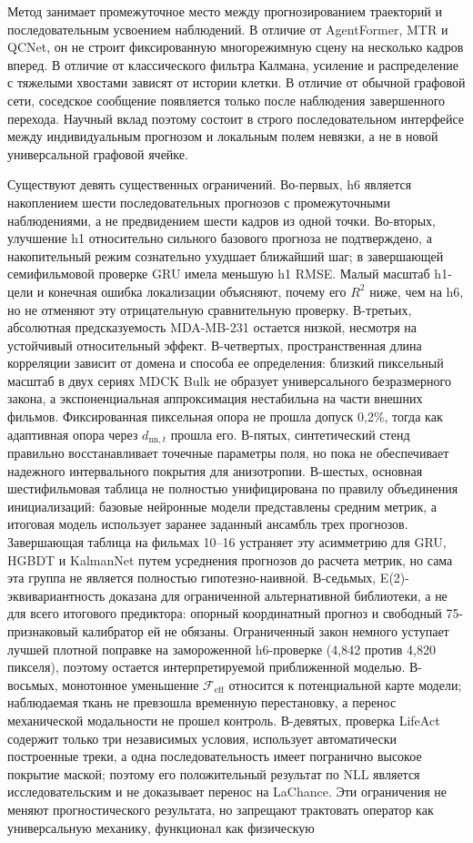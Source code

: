 \documentclass[11pt,a4paper]{article}
\begin{document}
Метод занимает промежуточное место между прогнозированием траекторий и последовательным усвоением наблюдений. В отличие от AgentFormer, MTR и QCNet, он не строит фиксированную многорежимную сцену на несколько кадров вперед. В отличие от классического фильтра Калмана, усиление и распределение с тяжелыми хвостами зависят от истории клетки. В отличие от обычной графовой сети, соседское сообщение появляется только после наблюдения завершенного перехода. Научный вклад поэтому состоит в строго последовательном интерфейсе между индивидуальным прогнозом и локальным полем невязки, а не в новой универсальной графовой ячейке.

Существуют девять существенных ограничений. Во-первых, h6 является накоплением шести последовательных прогнозов с промежуточными наблюдениями, а не предвидением шести кадров из одной точки. Во-вторых, улучшение h1 относительно сильного базового прогноза не подтверждено, а накопительный режим сознательно ухудшает ближайший шаг; в завершающей семифильмовой проверке GRU имела меньшую h1 RMSE. Малый масштаб h1-цели и конечная ошибка локализации объясняют, почему его $R^2$ ниже, чем на h6, но не отменяют эту отрицательную сравнительную проверку. В-третьих, абсолютная предсказуемость MDA-MB-231 остается низкой, несмотря на устойчивый относительный эффект. В-четвертых, пространственная длина корреляции зависит от домена и способа ее определения: близкий пиксельный масштаб в двух сериях MDCK Bulk не образует универсального безразмерного закона, а экспоненциальная аппроксимация нестабильна на части внешних фильмов. Фиксированная пиксельная опора не прошла допуск 0,2\%, тогда как адаптивная опора через $d_{\mathrm{nn},t}$ прошла его. В-пятых, синтетический стенд правильно восстанавливает точечные параметры поля, но пока не обеспечивает надежного интервального покрытия для анизотропии. В-шестых, основная шестифильмовая таблица не полностью унифицирована по правилу объединения инициализаций: базовые нейронные модели представлены средним метрик, а итоговая модель использует заранее заданный ансамбль трех прогнозов. Завершающая таблица на фильмах 10--16 устраняет эту асимметрию для GRU, HGBDT и KalmanNet путем усреднения прогнозов до расчета метрик, но сама эта группа не является полностью гипотезно-наивной. В-седьмых, E(2)-эквивариантность доказана для ограниченной альтернативной библиотеки, а не для всего итогового предиктора: опорный координатный прогноз и свободный 75-признаковый калибратор ей не обязаны. Ограниченный закон немного уступает лучшей плотной поправке на замороженной h6-проверке (4,842 против 4,820 пикселя), поэтому остается интерпретируемой приближенной моделью. В-восьмых, монотонное уменьшение $\mathcal F_{\mathrm{eff}}$ относится к потенциальной карте модели; наблюдаемая ткань не превзошла временную перестановку, а перенос механической модальности не прошел контроль. В-девятых, проверка LifeAct содержит только три независимых условия, использует автоматически построенные треки, а одна последовательность имеет погранично высокое покрытие маской; поэтому его положительный результат по NLL является исследовательским и не доказывает перенос на LaChance. Эти ограничения не меняют прогностического результата, но запрещают трактовать оператор как универсальную механику, функционал как физическую 
\end{document}
